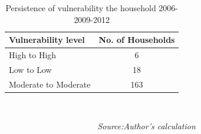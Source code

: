 \begin{table}[htb]
	\caption{Persistence of vulnerability the household 2006-2009-2012}
	\begin{center}
		\begin{tabular}{lc} \hline
			\textbf{Vulnerability level} & \textbf{No. of Households} \\	\hline
			High to High & 6 \\
			Low to Low            & 18         \\
			Moderate to Moderate  & 163  \\ \hline \hline     
		\end{tabular} \\
	\end{center}\vspace{-8pt}
	\textit{\ \ \ \ \ \ \ \ \ \ \ \ \ \ \ \ \ \ \ \ \ \ Source:Author's calculation}
	\label{tab:Vulnerabilitypersistence}
\end{table}

